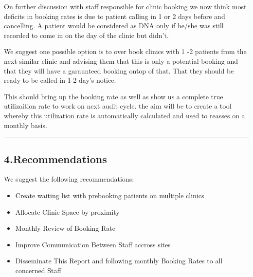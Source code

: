 \documentclass[]{article}
\providecommand{\tightlist}{%
  \setlength{\itemsep}{0pt}\setlength{\parskip}{0pt}}
\begin{document}
On further discussion with staff responsible for clinic booking we now
think most deficits in booking rates is due to patient calling in 1 or 2
days before and cancelling. A patient would be considered as DNA only if
he/she was still recorded to come in on the day of the clinic but
didn't.

We suggest one possible option is to over book clinics with 1 -2
patients from the next similar clinic and advising them that this is
only a potential booking and that they will have a garaunteed booking
ontop of that. That they should be ready to be called in 1-2 day's
notice.

This should bring up the booking rate as well as show us a complete true
utilizaition rate to work on next audit cycle. the aim will be to create
a tool whereby this utilization rate is automatically calculated and
used to reasses on a monthly basis.

\begin{center}\rule{0.5\linewidth}{0.5pt}\end{center}

\hypertarget{recommendations}{%
\subsection{4.Recommendations}\label{recommendations}}

We suggest the following recommendations:

\begin{itemize}
\tightlist
\item
  Create waiting list with prebooking patients on multiple clinics
\item
  Allocate Clinic Space by proximity\\
\item
  Monthly Review of Booking Rate\\
\item
  Improve Communication Between Staff accross sites\\
\item
  Disseminate This Report and following monthly Booking Rates to all
  concerned Staff
\end{itemize}
\end{document}
